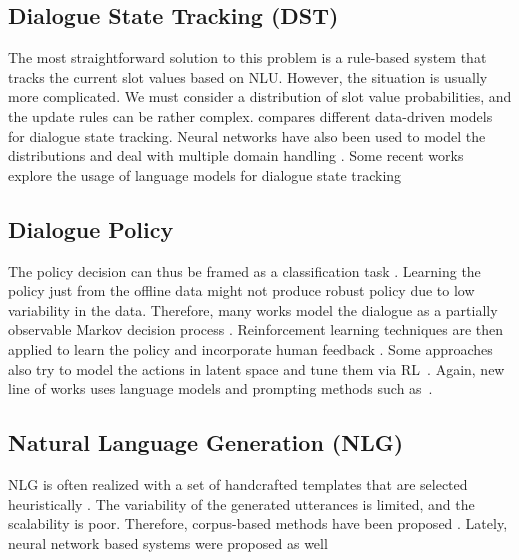 \subsection{Dialogue State Tracking (DST)} 
\label{relwork:DST}
The most straightforward solution to this problem is a rule-based system that tracks the current slot values based on NLU.
However, the situation is usually more complicated.
We must consider a distribution of slot value probabilities, and the update rules can be rather complex.
\citet{vzilka2013comparison} compares different data-driven models for dialogue state tracking.
Neural networks have also been used to model the distributions \cite{mrkvsic2016neural, zhong2018global} and deal with multiple domain handling \cite{rastogi2017scalable}.
Some recent works explore the usage of language models for dialogue state tracking~\cite{lee-etal-2021-dialogue, hu2022context}

\subsection{Dialogue Policy}
\label{relwork:policy}
The policy decision can thus be framed as a classification task \cite{gavsic2013gaussian}.
Learning the policy just from the offline data might not produce robust policy due to low variability in the data.
Therefore, many works model the dialogue as a partially observable Markov decision process \cite{gavsic2010gaussian, thomson2010bayesian}.
Reinforcement learning techniques are then applied to learn the policy and incorporate human feedback \cite{peng2017composite, su2016line}.
Some approaches also try to model the actions in latent space and tune them via RL~\cite{lubis-etal-2022-dialogue}.
Again, new line of works uses language models and prompting methods such as~\citep{zhang2023sgp}.
\subsection{Natural Language Generation (NLG)}
NLG is often realized with a set of handcrafted templates that are selected heuristically \cite{rudnicky_creating_1999}.
The variability of the generated utterances is limited, and the scalability is poor.
Therefore, corpus-based methods have been proposed \cite{oh2000stochastic, mairesse-young-2014-stochastic}.
Lately, neural network based systems were proposed as well \cite{wen-etal-2015-semantically, wen-etal-2016-multi}

